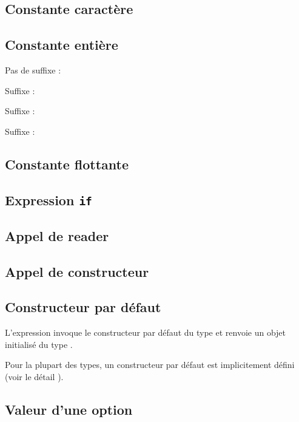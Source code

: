 \subsection{Constante caractère}

\subsection{Constante entière}

Pas de suffixe : 

Suffixe  : 

Suffixe  : 

Suffixe  : 

\subsection{Constante flottante}

\subsection{Expression \texttt{if}}

\subsection{Appel de reader}


\subsection{Appel de constructeur}



\subsection{Constructeur par défaut}

L'expression \galgas{[@T default]} invoque le constructeur par défaut du type  et renvoie un objet initialisé du type .

Pour la plupart des types, un constructeur par défaut est implicitement défini (voir le détail ).




\subsection{Valeur d'une option}






